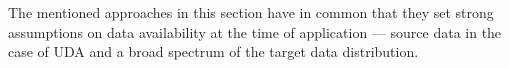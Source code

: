         The mentioned approaches in this section have in common that they set strong assumptions on data availability at the time of application --- source data in the case of UDA and a broad spectrum of the target data distribution.

